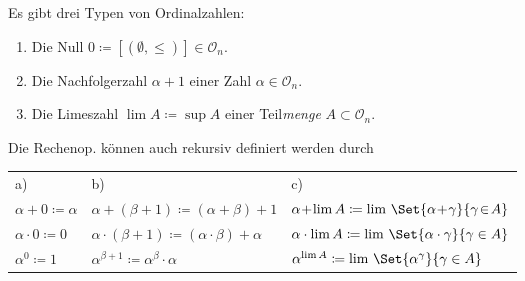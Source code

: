 \documentclass{cheat-sheet}
\newcommand{\Ord}{\mathcal{O}_n} %
\begin{document}
\begin{bem}
  Es gibt drei Typen von Ordinalzahlen:
  \begin{enumerate}[label=\alph*),leftmargin=1.6em]
    \item Die Null $0 \coloneqq [(\emptyset, \leq)] \in \Ord$.
    \item Die Nachfolgerzahl $\alpha + 1$ einer Zahl $\alpha \in \Ord$.
    \item Die Limeszahl $\lim A \coloneqq \sup A$ einer Teil{\em menge} $A \subset \Ord$.
  \end{enumerate}
\end{bem}

\begin{bem}
  Die Rechenop. können auch rekursiv definiert werden durch
  \tabcolsep=0.11cm
  \begin{tabular}{ l l l }
    a) & b) & c) \\[2pt]
    $\alpha + 0 \coloneqq \alpha$
    & $\alpha \!+\! (\beta \!+\! 1) \coloneqq (\alpha \!+\! \beta) \!+\! 1$
    & $\alpha \!+\! \lim A \coloneqq \lim \, \Set{\alpha \!+\! \gamma}{\gamma \!\in\! A}$ \\

    $\alpha \cdot 0 \coloneqq 0$
    & $\alpha \cdot (\beta \!+\! 1) \coloneqq (\alpha \cdot \beta) + \alpha$
    & $\alpha \cdot \lim A \coloneqq \lim \, \Set{\alpha \cdot \gamma}{\gamma \in A}$ \\

    $\alpha^0 \coloneqq 1$
    & $\alpha^{\beta + 1} \coloneqq \alpha^\beta \cdot \alpha$
    & $\alpha^{\lim A} \coloneqq \lim \, \Set{\alpha^\gamma}{\gamma \in A}$
  \end{tabular}
  \iffalse
  \begin{align*}
    \text{a) } \alpha + 0 \coloneqq \alpha, \qquad
    & \text{b) } \alpha + (\beta + 1) \coloneqq (\alpha + \beta) + 1, \\
    \text{c) } \alpha + \lim A &\coloneqq \lim \, \Set{\alpha + \gamma}{\gamma \in A}, \\[2pt]
    \text{a) } \alpha \cdot 0 \coloneqq 0, \qquad
    & \text{b) } \alpha \cdot (\beta + 1) \coloneqq (\alpha \cdot \beta) + \alpha, \\
    \text{c) } \alpha \cdot \lim A &\coloneqq \lim \, \Set{\alpha \cdot \gamma}{\gamma \in A}, \\[2pt]
    \text{a) } \alpha^0 \coloneqq 1, \qquad
    & \text{b) } \alpha^{\beta + 1} \coloneqq \alpha^\beta + 1, \\
    \text{c) } \alpha^{\lim A} &\coloneqq \lim \, \Set{\alpha^\gamma}{\gamma \in A}.
  \end{align*}
  \fi
\end{bem}
\end{document}
